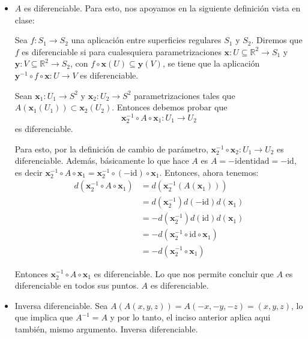 \begin{problema}
\begin{dem}
\begin{itemize}
\begin{itemize}
            \end{itemize}
            \item $A$ es diferenciable. Para esto, nos apoyamos en la siguiente definición vista en clase: 
            \begin{cajita}
                Sea $f: S_1 \rightarrow S_2$ una aplicación entre superficies regulares $S_1$ y $S_2$. Diremos que $f$ es diferenciable si para cualesquiera parametrizaciones $\mathbf{x}: U \subseteq \mathbb{R}^2 \rightarrow S_1$ y $\mathbf{y}: V \subseteq \mathbb{R}^2 \rightarrow S_2$, con $f \circ \mathbf{x}(U) \subseteq \mathbf{y}(V)$, se tiene que la aplicación $\mathbf{y}^{-1} \circ f \circ \mathbf{x}: U \rightarrow V$ es diferenciable.
            \end{cajita}
            Sean $\mathbf{x}_1:U_1\to S^2$ y $\mathbf{x}_2:U_2\to S^2$ parametrizaciones tales que $A(\mathbf{x}_1(U_1))\subset \mathbf{x}_2(U_2)$. Entonces debemos probar que $$ \mathbf{x}_2^{-1}\circ A\circ \mathbf{x}_1:U_1\to U_2 $$ es diferenciable.

            Para esto, por la definición de cambio de parámetro, $\mathbf{x}_2^{-1}\circ \mathbf{x}_2:U_1\to U_2$ es diferenciable. Además, básicamente lo que hace $A$ es $A=-\mathrm{identidad}=-\mathrm{id}$, es decir $\mathbf{x}_2^{-1}\circ A\circ \mathbf{x}_1=\mathbf{x}_2^{-1}\circ (-\mathrm{id})\circ \mathbf{x}_1$. Entonces, ahora tenemos:
            \begin{align*}
                d(\mathbf{x}_2^{-1}\circ A\circ \mathbf{x}_1)&=d( \mathbf{x}_2^{-1}(A( \mathbf{x}_1)))\\
                &=d(\mathbf{x}_2^{-1})d(-\mathrm{id})d(\mathbf{x}_1)\\
                &=-d(\mathbf{x}_2^{-1})d(\mathrm{id})d(\mathbf{x}_1)\\
                &=-d(\mathbf{x}_2^{-1}\circ \mathrm{id}\circ \mathbf{x}_1)\\
                &=-d(\mathbf{x}_2^{-1}\circ \mathbf{x}_1)
            \end{align*}
            
            Entonces $\mathbf{x}_2^{-1}\circ A\circ \mathbf{x}_1$ es diferenciable. Lo que nos permite concluir que $A$ es diferenciable en todos sus puntos. $A$ es diferenciable. 
            \item Inversa diferenciable. Sea $A(A(x,y,z))=A(-x,-y,-z)=(x,y,z)$, lo que implica que $A^{-1}=A$ y por lo tanto, el inciso anterior aplica aqui también, mismo argumento. Inversa diferenciable. 

            
        \end{itemize}
    \end{dem}
    
\end{problema}


